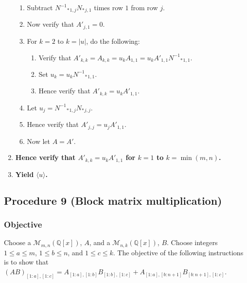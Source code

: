 \documentclass[twocolumn]{article}
\begin{document}
\begin{enumerate}
\begin{enumerate}
						\item Subtract ${{N^{-1}}_*}_{1,j}{N_*}_{j,1}$ times row $1$ from row $j$.
						\item Now verify that $A'_{j,1}=0$.
						\item For $k=2$ to $k=\lvert u\rvert$, do the following:
						\begin{enumerate}
							\item Verify that $A'_{k,k}=A_{k,k}=u_kA_{1,1}=u_kA'_{1,1}{{N^{-1}}_*}_{1,1}$.
							\item Set $u_k=u_k{{N^{-1}}_*}_{1,1}$.
							\item Hence verify that $A'_{k,k}=u_kA'_{1,1}$.
						\end{enumerate}
						\item Let $u_j={{N^{-1}}_*}_{1,j}{N_*}_{j,j}$.
						\item Hence verify that $A'_{j,j}=u_jA'_{1,1}$.
						\item Now let $A=A'$.
					\end{enumerate}
					\item \textbf{Hence verify that $A'_{k,k}=u_kA'_{1,1}$ for $k=1$ to $k=\min(m,n)$.}
					\item \textbf{Yield $\langle u\rangle$.}
				\end{enumerate}
		\subsection{Procedure 9 (Block matrix multiplication)}\label{sec:procedure 9}
			\subsubsection{Objective}
				Choose a $\mathcal{M}_{m,n}(\mathbb{Q}[x])$, $A$, and a $\mathcal{M}_{n,k}(\mathbb{Q}[x])$, $B$. Choose integers $1\le a\le m$, $1\le b\le n$, and $1\le c\le k$. The objective of the following instructions is to show that $(AB)_{[1:a],[1:c]}=A_{[1:a],[1:b]}B_{[1:b],[1:c]}+A_{[1:a],[b:n+1]}B_{[b:n+1],[1:c]}$.
\end{document}
